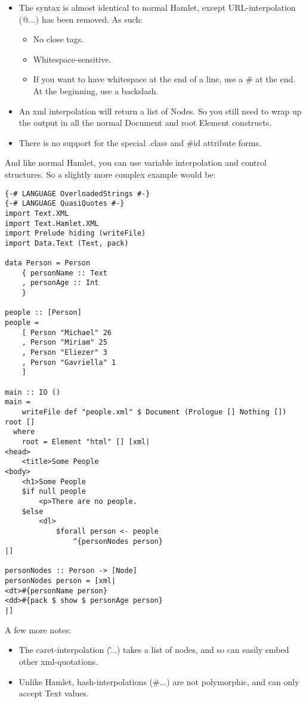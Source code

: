 \begin{itemize}
\item The syntax is almost identical to normal Hamlet, except URL-interpolation (@{...}) has been removed. As such:

\begin{itemize}
\item No close tags.
\item Whitespace-sensitive.
\item If you want to have whitespace at the end of a line, use a \# at the end. At the beginning, use a backslash.
\end{itemize}
  
\item An xml interpolation will return a list of Nodes. So you still need to wrap up the output in all the normal Document and root Element constructs.
\item There is no support for the special .class and \#id attribute forms.
\end{itemize}

And like normal Hamlet, you can use variable interpolation and control structures. So a slightly more complex example would be:

\begin{lstlisting}
{-# LANGUAGE OverloadedStrings #-}
{-# LANGUAGE QuasiQuotes #-}
import Text.XML
import Text.Hamlet.XML
import Prelude hiding (writeFile)
import Data.Text (Text, pack)

data Person = Person
    { personName :: Text
    , personAge :: Int
    }

people :: [Person]
people =
    [ Person "Michael" 26
    , Person "Miriam" 25
    , Person "Eliezer" 3
    , Person "Gavriella" 1
    ]

main :: IO ()
main =
    writeFile def "people.xml" $ Document (Prologue [] Nothing []) root []
  where
    root = Element "html" [] [xml|
<head>
    <title>Some People
<body>
    <h1>Some People
    $if null people
        <p>There are no people.
    $else
        <dl>
            $forall person <- people
                ^{personNodes person}
|]

personNodes :: Person -> [Node]
personNodes person = [xml|
<dt>#{personName person}
<dd>#{pack $ show $ personAge person}
|]
\end{lstlisting}%

A few more notes:

\begin{itemize}
\item The caret-interpolation (\^{...}) takes a list of nodes, and so can easily embed other xml-quotations.
\item Unlike Hamlet, hash-interpolations (\#{...}) are not polymorphic, and can only accept Text values.
\end{itemize}

